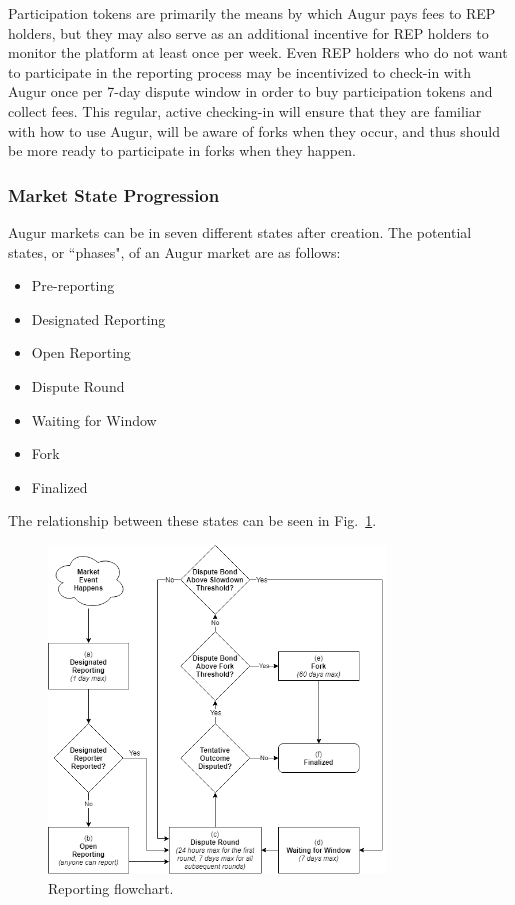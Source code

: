 \documentclass[floatfix,reprint,nofootinbib,amsmath,amssymb,epsfig,pre,floats,letterpaper,groupedaffiliation]{revtex4-1}
\theoremstyle{definition}
\theoremstyle{definition}
\begin{document}
Participation tokens are primarily the means by which Augur pays fees to REP holders, but they may also serve as an additional incentive for REP holders to monitor the platform at least once per week. Even REP holders who do not want to participate in the reporting process may be incentivized to check-in with Augur once per 7-day dispute window in order to buy participation tokens and collect fees. This regular, active checking-in will ensure that they are familiar with how to use Augur, will be aware of forks when they occur, and thus should be more ready to participate in forks when they happen.

\subsubsection{Market State Progression}

Augur markets can be in seven different states after creation.  The potential states, or ``phases", of an Augur market are as follows:
\begin{itemize}
\item Pre-reporting
\item Designated Reporting
\item Open Reporting
\item Dispute Round
\item Waiting for Window
\item Fork
\item Finalized
\end{itemize}

The relationship between these states can be seen in Fig.~\ref{fig:reporting}.

\begin{figure}
\includegraphics[width=0.8\textwidth]{new_reporting.png}
\caption{Reporting flowchart.}
\label{fig:reporting}
\end{figure}
\end{document}
